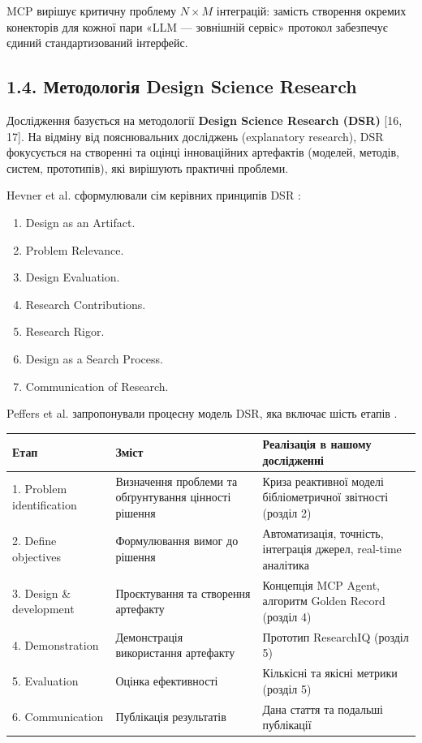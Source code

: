 MCP вирішує критичну проблему $N\times M$ інтеграцій: замість створення окремих конекторів для кожної пари «LLM --- зовнішній сервіс» протокол забезпечує єдиний стандартизований інтерфейс.


\subsection*{1.4. Методологія Design Science Research}

Дослідження базується на методології \textbf{Design Science Research (DSR)} [16, 17]. На відміну від пояснювальних досліджень (explanatory research), DSR фокусується на створенні та оцінці інноваційних артефактів (моделей, методів, систем, прототипів), які вирішують практичні проблеми.

Hevner et al. сформулювали сім керівних принципів DSR \cite{Hevner2004DSR}:
\begin{enumerate}[leftmargin=*,itemsep=0.2em]
\item Design as an Artifact.
\item Problem Relevance.
\item Design Evaluation.
\item Research Contributions.
\item Research Rigor.
\item Design as a Search Process.
\item Communication of Research.
\end{enumerate}

Peffers et al. запропонували процесну модель DSR, яка включає шість етапів \cite{Peffers2007DSRMeth}.
\begin{longtable}{@{}p{}p{}p{}@{}}
\toprule
\textbf{Етап} & \textbf{Зміст} & \textbf{Реалізація в нашому дослідженні} \\
\midrule
1. Problem identification & Визначення проблеми та обґрунтування цінності рішення & Криза реактивної моделі бібліометричної звітності (розділ 2) \\
2. Define objectives & Формулювання вимог до рішення & Автоматизація, точність, інтеграція джерел, real-time аналітика \\
3. Design \& development & Проєктування та створення артефакту & Концепція MCP Agent, алгоритм Golden Record (розділ 4) \\
4. Demonstration & Демонстрація використання артефакту & Прототип ResearchIQ (розділ 5) \\
5. Evaluation & Оцінка ефективності & Кількісні та якісні метрики (розділ 5) \\
6. Communication & Публікація результатів & Дана стаття та подальші публікації \\
\bottomrule
\end{longtable}

